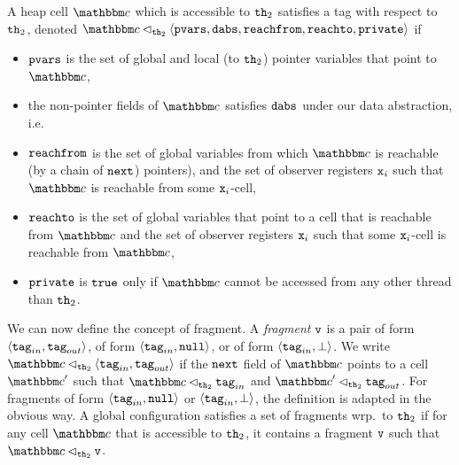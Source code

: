 A heap cell $\cell$ which is accessible to ${\tt th}_2$ satisfies a tag
with respect to ${\tt th}_2$,
denoted $\cell \satfrag{{\thread_2}} \tagtuple$ if
\begin{itemize}
\item
  $\mathtt{pvars}$ is the set of global and local (to ${\tt th}_2$)
  pointer variables that point to $\cell$,
\item
the non-pointer fields of $\cell$ satisfies $\mathtt{dabs}$ under our data abstraction, i.e.
\item $\mathtt{reachfrom}$ is the set of global variables from which $\cell$ is 
  reachable (by a chain of ${\tt next}$) pointers), and the set of
  observer registers $\mathtt{x}_i$ such that $\cell$ is reachable from some $\mathtt{x}_i$-cell,
\item $\mathtt{reachto}$ is the set of global variables that point to a cell that
  is reachable from $\cell$ and  the set of
  observer registers $\mathtt{x}_i$ such that some $\mathtt{x}_i$-cell is reachable from $\cell$,
\item $\mathtt{private}$ is ${\tt true}$ only if $\cell$ cannot be accessed from any
  other thread than ${\tt th}_2$.
\end{itemize}

We can now define the concept of fragment.
A {\em fragment} $\mathtt{v}$ is a pair of form $\left\langle\mathtt{tag}_{in},\mathtt{tag}_{out}\right\rangle$, 
of form $\left\langle\mathtt{tag}_{in},{\tt null}\right\rangle$, or 
of form $\left\langle\mathtt{tag}_{in},\bot\right\rangle$.
We write  
$\cell \satfrag{{\thread_2}} \tuple{\inputtag,\outputtag}$ if
the ${\tt next}$ field of $\cell$ points to a cell $\cell'$ such that
$\cell \satfrag{{\thread_2}} \inputtag$ and
$\cell' \satfrag{{\thread_2}} \outputtag$.
For fragments of form $\left\langle\mathtt{tag}_{in},{\tt null}\right\rangle$ 
or $\left\langle\mathtt{tag}_{in},\bot\right\rangle$, the definition is adapted in the obvious way.
A global configuration satisfies a set of fragments wrp.\ to ${\tt th}_2$ if
for any cell $\cell$ that is accessible to ${\tt th}_2$, it contains a fragment
$\mathtt{v}$ such that $\cell \satfrag{{\thread_2}} \frag$.

